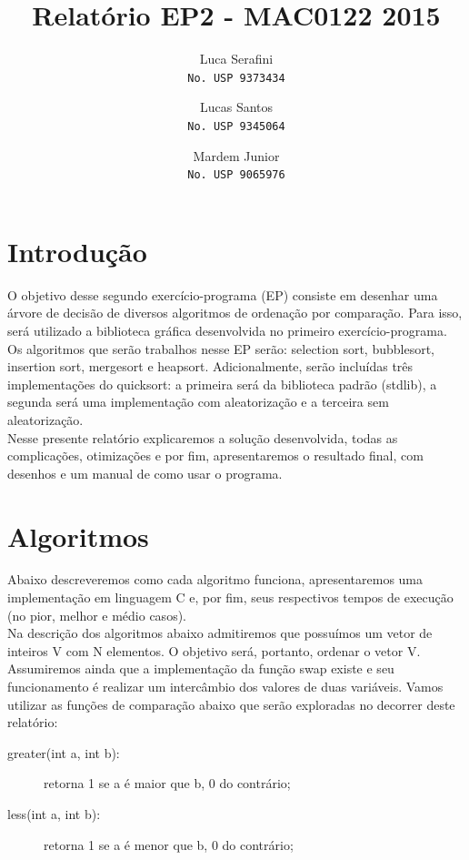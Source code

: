 \documentclass[12pt,a4paper]{article}
\title{Relatório EP2 - MAC0122 2015}
\author{
	Luca Serafini\\
	\texttt{No. USP 9373434}
	\and
	Lucas Santos\\
	\texttt{No. USP 9345064}
	\and
	Mardem Junior\\
	\texttt{No. USP 9065976}
}
\begin{document}
	\maketitle

	\section{Introdução}
	\indent O objetivo desse segundo exercício-programa (EP) consiste em desenhar uma árvore de decisão de diversos algoritmos de ordenação por comparação. Para isso, será utilizado a biblioteca gráfica desenvolvida no primeiro exercício-programa.\\
	\indent Os algoritmos que serão trabalhos nesse EP serão: selection sort, bubblesort, insertion sort, mergesort e heapsort. Adicionalmente, serão incluídas três implementações do quicksort: a primeira será da biblioteca padrão (stdlib), a segunda será uma implementação com aleatorização e a terceira sem aleatorização.\\
	\indent Nesse presente relatório explicaremos a solução desenvolvida, todas as complicações, otimizações e por fim, apresentaremos o resultado final, com desenhos e um manual de como usar o programa.


	\section{Algoritmos}
	\indent Abaixo descreveremos como cada algoritmo funciona, apresentaremos uma implementação em linguagem C e, por fim, seus respectivos tempos de execução (no pior, melhor e médio casos).\\
	\indent Na descrição dos algoritmos abaixo admitiremos que possuímos um vetor de inteiros V com N elementos. O objetivo será, portanto, ordenar o vetor V.\\
	\indent Assumiremos ainda que a implementação da função swap existe e seu funcionamento é realizar um intercâmbio dos valores de duas variáveis. Vamos utilizar as funções de comparação abaixo que serão exploradas no decorrer deste relatório:
	\begin{description}
	\item [greater(int a, int b):] retorna 1 se a é maior que b, 0 do contrário;
	\item [less(int a, int b):] retorna 1 se a é menor que b, 0 do contrário;
	\end{description}


\end{document}
